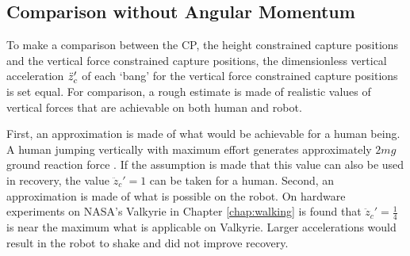 \subsection{Comparison without Angular Momentum}\label{sec:capcomparenoinertia}
To make a comparison between the \ac{CP}, the height constrained capture positions and the vertical force constrained capture positions, the dimensionless vertical acceleration $\ddot{z}_{c}'$ of each `bang' for the vertical force constrained capture positions is set equal. For comparison, a rough estimate is made of realistic values of vertical forces that are achievable on both human and robot.

First, an approximation is made of what would be achievable for a human being. A human jumping vertically with maximum effort generates approximately $2mg$ ground reaction force \cite{linthorne2001analysis}. If the assumption is made that this value can also be used in recovery, the value $\ddot{z}_c'=1$ can be taken for a human. Second, an approximation is made of what is possible on the robot. On hardware experiments on NASA's Valkyrie in Chapter \ref{chap:walking} is found that $\ddot{z}_c'=\frac{1}{4}$ is near the maximum what is applicable on Valkyrie. Larger accelerations would result in the robot to shake and did not improve recovery. 

